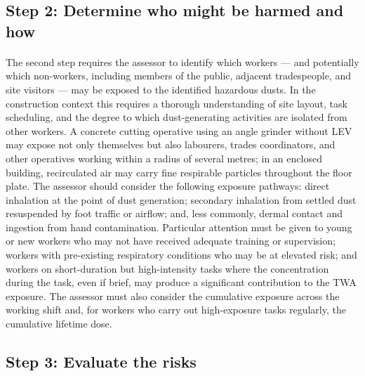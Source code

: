 \subsection{Step 2: Determine who might be harmed and how}

\paragraph{}
The second step requires the assessor to identify which workers --- and potentially which non-workers, including members of the public, adjacent tradespeople, and site visitors --- may be exposed to the identified hazardous dusts. In the construction context this requires a thorough understanding of site layout, task scheduling, and the degree to which dust-generating activities are isolated from other workers. A concrete cutting operative using an angle grinder without LEV may expose not only themselves but also labourers, trades coordinators, and other operatives working within a radius of several metres; in an enclosed building, recirculated air may carry fine respirable particles throughout the floor plate. The assessor should consider the following exposure pathways: direct inhalation at the point of dust generation; secondary inhalation from settled dust resuspended by foot traffic or airflow; and, less commonly, dermal contact and ingestion from hand contamination. Particular attention must be given to young or new workers who may not have received adequate training or supervision; workers with pre-existing respiratory conditions who may be at elevated risk; and workers on short-duration but high-intensity tasks where the concentration during the task, even if brief, may produce a significant contribution to the TWA exposure. The assessor must also consider the cumulative exposure across the working shift and, for workers who carry out high-exposure tasks regularly, the cumulative lifetime dose.

\subsection{Step 3: Evaluate the risks}

